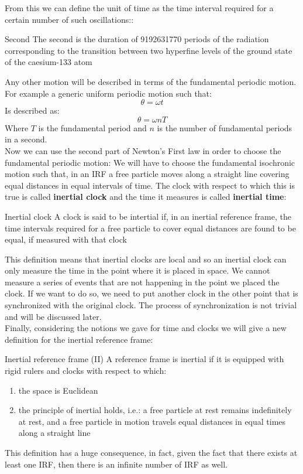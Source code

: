 From this we can define the unit of time as the time interval required for a certain number of such oscillations::
\begin{definition}{Second}
  The second is the duration of 9192631770 periods of the radiation corresponding to the transition between two hyperfine levels of the ground state of the caesium-133 atom
\end{definition}
Any other motion will be described in terms of the fundamental periodic motion. For example a generic uniform periodic motion such that:
\begin{equation}
  \theta = \omega t
\end{equation}
Is described as:
\begin{equation}
  \theta = \omega n T
\end{equation}
Where $T$ is the fundamental period and $n$ is the number of fundamental periods in a second.\\
Now we can use the second part of Newton's First law in order to choose the fundamental periodic motion:
We will have to choose the fundamental isochronic motion such that, in an IRF a free particle moves along a straight line covering equal distances in equal intervals of time. The clock with respect to which this is true is called \textbf{inertial clock} and the time it measures is called \textbf{inertial time}:
\begin{definition}{Inertial clock}
  A clock is said to be intertial if, in an inertial reference frame, the time intervals required for a free particle to cover equal distances are found to be equal, if measured with that clock
\end{definition}
This definition means that inertial clocks are local and so an inertial clock can only measure the time in the point where it is placed in space. We cannot measure a series of events that are not happening in the point we placed the clock. If we want to do so, we need to put another clock in the other point that is synchronized with the original clock. The process of synchronization is not trivial and will be discussed later.\\
Finally, considering the notions we gave for time and clocks we will give a new definition for the inertial reference frame:
\begin{definition}{Inertial reference frame (II)}
  A reference frame is inertial if it is equipped with rigid rulers and clocks with respect to which:
  \begin{enumerate}
    \item the space is Euclidean
    \item the principle of inertial holds, i.e.: a free particle at rest remains indefinitely at rest, and a free particle in motion travels equal distances in equal times along a straight line
  \end{enumerate}
\end{definition}
This definition has a huge consequence, in fact, given the fact that there exists at least one IRF, then there is an infinite number of IRF as well.
